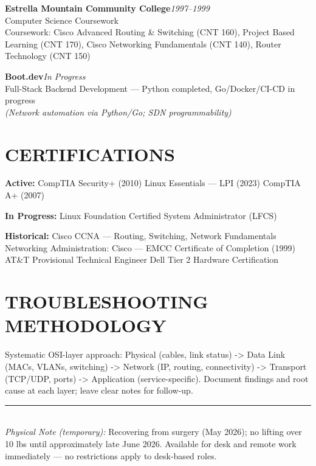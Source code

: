 \documentclass[9pt,letterpaper]{extarticle}
\begin{document}
\newpage
\noindent\textbf{Estrella Mountain Community College}\hfill\textit{1997--1999}\\
Computer Science Coursework\\
Coursework: Cisco Advanced Routing \& Switching (CNT 160), Project Based Learning (CNT 170), Cisco Networking Fundamentals (CNT 140), Router Technology (CNT 150)

\vspace{4pt}
\noindent\textbf{Boot.dev}\hfill\textit{In Progress}\\
Full-Stack Backend Development --- Python completed, Go/Docker/CI-CD in progress\\
\textit{(Network automation via Python/Go; SDN programmability)}

\section*{CERTIFICATIONS}

\textbf{Active:} CompTIA Security+ (2010) \textbullet{} Linux Essentials --- LPI (2023) \textbullet{} CompTIA A+ (2007)

\textbf{In Progress:} Linux Foundation Certified System Administrator (LFCS)

\textbf{Historical:} Cisco CCNA --- Routing, Switching, Network Fundamentals \textbullet{} Networking Administration: Cisco --- EMCC Certificate of Completion (1999) \textbullet{} AT\&T Provisional Technical Engineer \textbullet{} Dell Tier 2 Hardware Certification

\section*{TROUBLESHOOTING METHODOLOGY}

Systematic OSI-layer approach: Physical (cables, link status) -> Data Link (MACs, VLANs, switching) -> Network (IP, routing, connectivity) -> Transport (TCP/UDP, ports) -> Application (service-specific). Document findings and root cause at each layer; leave clear notes for follow-up.

\vspace{8pt}
\noindent\rule{\linewidth}{0.4pt}
\vspace{3pt}
\\[2pt]
{\small\textit{Physical Note (temporary):} Recovering from surgery (May 2026); no lifting over 10 lbs until approximately late June 2026. Available for desk and remote work immediately --- no restrictions apply to desk-based roles.}
\end{document}
